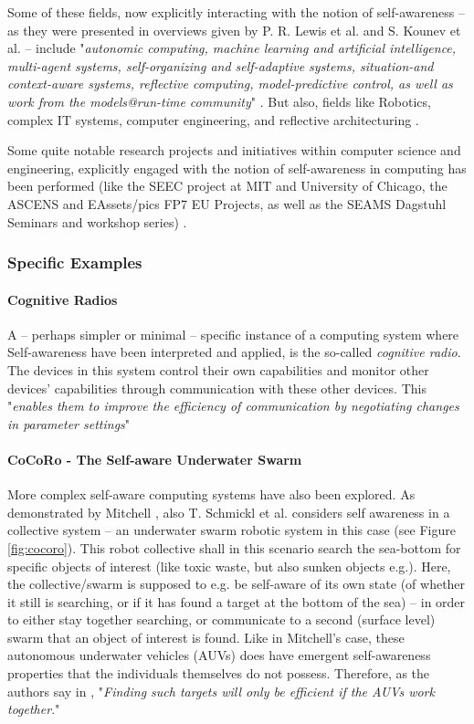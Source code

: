 	Some of these fields, now explicitly interacting with the notion of self-awareness -- as they were presented in overviews given by P. R. Lewis et al. \cite{sacs17_ch3} and S. Kounev et al. \cite{sacs17_ch1} -- include "\textit{autonomic computing, machine learning and artificial intelligence, multi-agent systems, self-organizing and self-adaptive systems, situation-and context-aware systems, reflective computing, model-predictive control, as well as work from the models@run-time community}" \cite{sacs17_ch1}. But also, fields like Robotics, complex IT systems, computer engineering, and reflective architecturing \cite{sacs17_ch3}.

	Some quite notable research projects and initiatives within computer science and engineering, explicitly engaged with the notion of self-awareness in computing has been performed (like the SEEC project at MIT and University of Chicago, the ASCENS and EAssets/pics FP7 EU Projects, as well as the SEAMS Dagstuhl Seminars and workshop series) \cite{sacs17_ch1}.


		\subsubsection{Specific Examples}

			\paragraph{Cognitive Radios}

			A -- perhaps simpler or minimal -- specific instance of a computing system where Self-awareness have been interpreted and applied, is the so-called \textit{cognitive radio}. The devices in this system control their own capabilities and monitor other devices' capabilities through communication with these other devices. This "\textit{enables them to improve the efficiency of communication by negotiating changes in parameter settings}" \cite{sacs17_ch3}

			\paragraph{CoCoRo - The Self-aware Underwater Swarm}

			More complex self-aware computing systems have also been explored. As demonstrated by Mitchell \cite{mitchell}, also T. Schmickl et al. considers self awareness in a collective system -- an underwater swarm robotic system \cite{cocoro} in this case (see Figure \ref{fig:cocoro}). This robot collective shall in this scenario search the sea-bottom for specific objects of interest (like toxic waste, but also sunken objects e.g.). Here, the collective/swarm is supposed to e.g. be self-aware of its own state (of whether it still is searching, or if it has found a target at the bottom of the sea) -- in order to either stay together searching, or communicate to a second (surface level) swarm that an object of interest is found. Like in Mitchell's case, these autonomous underwater vehicles (AUVs) does have emergent self-awareness properties that the individuals themselves do not possess. Therefore, as the authors say in \cite{cocoro}, "\textit{Finding such targets will only be efficient if the AUVs work together}."

